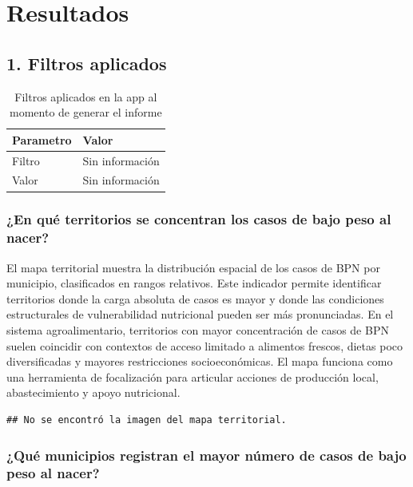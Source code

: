 \documentclass[
]{article}
\begin{document}
\section{Resultados}\label{resultados}

\subsection{1. Filtros aplicados}\label{filtros-aplicados}

\begin{table}

\caption{\label{tab:unnamed-chunk-1}Filtros aplicados en la app al momento de generar el informe}
\centering
\begin{tabular}[t]{p{}p{}}
\toprule
Parametro & Valor\\
\midrule
Filtro & Sin información\\
Valor & Sin información\\
\bottomrule
\end{tabular}
\end{table}

\subsubsection{¿En qué territorios se concentran los casos de bajo peso
al
nacer?}\label{en-quuxe9-territorios-se-concentran-los-casos-de-bajo-peso-al-nacer}

El mapa territorial muestra la distribución espacial de los casos de BPN
por municipio, clasificados en rangos relativos. Este indicador permite
identificar territorios donde la carga absoluta de casos es mayor y
donde las condiciones estructurales de vulnerabilidad nutricional pueden
ser más pronunciadas. En el sistema agroalimentario, territorios con
mayor concentración de casos de BPN suelen coincidir con contextos de
acceso limitado a alimentos frescos, dietas poco diversificadas y
mayores restricciones socioeconómicas. El mapa funciona como una
herramienta de focalización para articular acciones de producción local,
abastecimiento y apoyo nutricional.

\begin{verbatim}
## No se encontró la imagen del mapa territorial.
\end{verbatim}

\subsubsection{¿Qué municipios registran el mayor número de casos de
bajo peso al
nacer?}\label{quuxe9-municipios-registran-el-mayor-nuxfamero-de-casos-de-bajo-peso-al-nacer}
\end{document}
